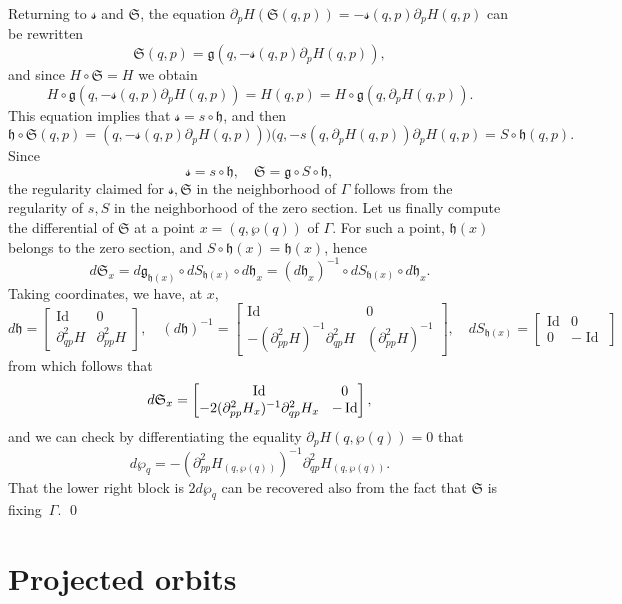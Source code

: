 \documentclass[10pt]{amsart}
\DeclareMathOperator{\Id}{Id}
\newcommand{\gS}{\ensuremath{\mathfrak{S}}}
\newcommand{\ms}{\ensuremath{\mathscr{s}}}
\theoremstyle{plain}
\theoremstyle{definition}
\begin{document}
Returning to $\ms$ and $\gS$, the equation
$
\partial_pH(\gS(q,p))= -\ms(q,p)\partial_pH(q,p)
$
can be rewritten
\[
\gS(q,p)=\mathfrak{g} (q,-\ms(q,p) \partial_p H(q,p)),
\]
and since $H\circ \gS=H$ we obtain
\[
H\circ \mathfrak{g} (q, -\ms(q,p) \partial_p H(q,p))
=H(q,p)=H\circ \mathfrak{g} (q, \partial_pH(q,p)).
\]
This equation implies that $\ms=s\circ \mathfrak{h}$, and then
\[
\mathfrak{h}\circ \gS(q,p)= (q, -\ms(q,p)\partial_pH(q,p)))
(q, -s(q,\partial_pH(q,p))\partial_pH(q,p)= S\circ \mathfrak{h}(q,p).
\]
Since
\[
\ms=s \circ \mathfrak{h},\quad \gS=\mathfrak{g}\circ S\circ \mathfrak{h},
\]
the regularity claimed for $\ms,\gS$ in the neighborhood of $\Gamma$ follows from the regularity of $s,S$ in the neighborhood of the zero section.
Let us finally compute the differential of $\gS$ at a point $x=(q, \wp(q))$ of $\Gamma$. For such a point, $\mathfrak{h}(x)$
belongs to the zero section, and
$S\circ \mathfrak{h}(x)=\mathfrak{h}(x)$, hence
\[
d\gS_x
=d\mathfrak{g}_{\mathfrak{h}(x)}\circ dS_{\mathfrak{h}(x)}\circ d\mathfrak{h}_x
=(d\mathfrak{h}_x )^{-1}\circ dS_{\mathfrak{h}(x)}\circ d\mathfrak{h}_x.
\]
Taking coordinates, we have, at $x$,
\[
d\mathfrak{h}=
\begin{bmatrix}
\Id&0\\ \partial^2_{qp}H &\partial^2_{pp}H
\end{bmatrix}, \quad
(d\mathfrak{h})^{-1}=
\begin{bmatrix}
\Id&0\\ -(\partial^2_{pp}H)^{-1} \partial^2_{qp}H &(\partial^2_{pp}H)^{-1}
\end{bmatrix}, \quad
dS_{\mathfrak{h}(x)}=
\begin{bmatrix}
\Id&0\\0&-\Id
\end{bmatrix}
\]
from which follows that
\[\arraycolsep4.5pt
d\gS_x=\begin{bmatrix}
\Id&0\\ -2(\partial^2_{pp}H_x)^{-1} \partial^2_{qp}H_x &-\Id
\end{bmatrix},
\]
and we can check by differentiating the equality
$
\partial_pH(q, \wp (q))=0
$
that
\[
d\wp_q=-
(\partial^2_{pp}H_{(q, \wp(q))})^{-1}
\partial^2_{qp}H_{(q, \wp(q))}.
\]
That the lower right block is $2d\wp_q$ can be recovered also from the fact that $\gS$ is fixing~$\Gamma$.
\qed

\section{Projected orbits}\label{sec-proj}
\end{document}
